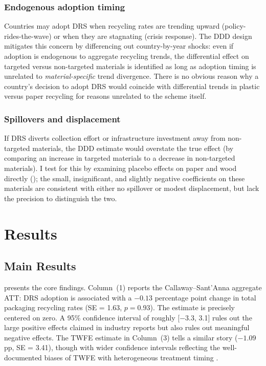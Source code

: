\documentclass[12pt]{article}
\begin{document}
\subsubsection*{Endogenous adoption timing} Countries may adopt DRS when recycling rates are trending upward (policy-rides-the-wave) or when they are stagnating (crisis response). The DDD design mitigates this concern by differencing out country-by-year shocks: even if adoption is endogenous to aggregate recycling trends, the differential effect on targeted versus non-targeted materials is identified as long as adoption timing is unrelated to \textit{material-specific} trend divergence. There is no obvious reason why a country's decision to adopt DRS would coincide with differential trends in plastic versus paper recycling for reasons unrelated to the scheme itself.

\subsubsection*{Spillovers and displacement} If DRS diverts collection effort or infrastructure investment away from non-targeted materials, the DDD estimate would overstate the true effect (by comparing an increase in targeted materials to a decrease in non-targeted materials). I test for this by examining placebo effects on paper and wood directly (); the small, insignificant, and slightly negative coefficients on these materials are consistent with either no spillover or modest displacement, but lack the precision to distinguish the two.


\section{Results}
\label{sec:results}

\subsection{Main Results}

 presents the core findings. Column~(1) reports the Callaway--Sant'Anna aggregate ATT: DRS adoption is associated with a $-0.13$ percentage point change in total packaging recycling rates (SE = 1.63, $p = 0.93$). The estimate is precisely centered on zero. A 95\% confidence interval of roughly [$-3.3$, 3.1] rules out the large positive effects claimed in industry reports but also rules out meaningful negative effects. The TWFE estimate in Column~(3) tells a similar story ($-1.09$ pp, SE = 3.41), though with wider confidence intervals reflecting the well-documented biases of TWFE with heterogeneous treatment timing \citep{goodmanbacon2021difference}.
\end{document}
